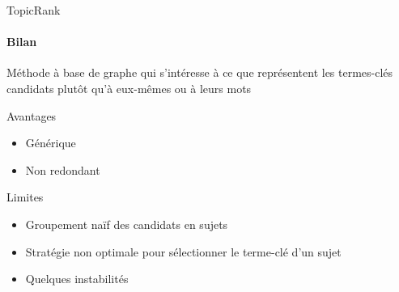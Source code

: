 \begin{frame}{TopicRank}\framesubtitle{Bilan}
  Méthode à base de graphe qui s'intéresse à ce que représentent les
  termes-clés candidats plutôt qu'à eux-mêmes ou à leurs mots

  \vspace{1em}

  \begin{block}{Avantages}
    \begin{itemize}
      \item{Générique}
      \item{Non redondant}
    \end{itemize}
  \end{block}

  \vspace{1em}

  \begin{alertblock}{Limites}
    \begin{itemize}
      \item{Groupement naïf des candidats en sujets}
      \item{Stratégie non optimale pour sélectionner le terme-clé d'un sujet}
      \item{Quelques instabilités}
    \end{itemize}
  \end{alertblock}
\end{frame}

